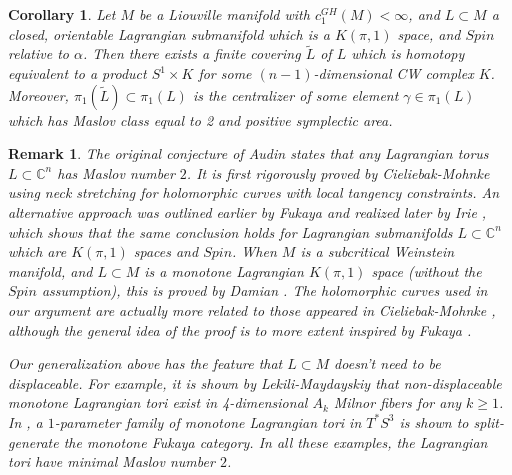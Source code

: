 \documentclass[a4paper]{article}
\newtheorem{corollary}[theorem]{Corollary}
\newtheorem{remark}[theorem]{Remark}
\numberwithin{equation}{section}
\begin{document}
\begin{corollary}\label{corollary:n}
Let $M$ be a Liouville manifold with $c_1^\mathit{GH}(M)<\infty$, and $L\subset M$ a closed, orientable Lagrangian submanifold which is a $K(\pi,1)$ space, and $\mathit{Spin}$ relative to $\alpha$. Then there exists a finite covering $\widetilde{L}$ of $L$ which is homotopy equivalent to a product $S^1\times K$ for some $(n-1)$-dimensional CW complex $K$. Moreover, $\pi_1(\widetilde{L})\subset\pi_1(L)$ is the centralizer of some element $\gamma\in\pi_1(L)$ which has Maslov class equal to 2 and positive symplectic area.
\end{corollary}

\begin{remark}\label{remark:Audin}
The original conjecture of Audin \cite{ma} states that any Lagrangian torus $L\subset\mathbb{C}^n$ has Maslov number $2$. It is first rigorously proved by Cieliebak-Mohnke \cite{cm} using neck stretching for holomorphic curves with local tangency constraints. An alternative approach was outlined earlier by Fukaya \cite{kf} and realized later by Irie \cite{ki2,ki3}, which shows that the same conclusion holds for Lagrangian submanifolds $L\subset\mathbb{C}^n$ which are $K(\pi,1)$ spaces and $\mathit{Spin}$. When $M$ is a subcritical Weinstein manifold, and $L\subset M$ is a monotone Lagrangian $K(\pi,1)$ space (without the $\mathit{Spin}$ assumption), this is proved by Damian \cite{md}. The holomorphic curves used in our argument are actually more related to those appeared in Cieliebak-Mohnke \cite{cm}, although the general idea of the proof is to more extent inspired by Fukaya \cite{kf}. 

Our generalization above has the feature that $L\subset M$ doesn't need to be displaceable. For example, it is shown by Lekili-Maydayskiy \cite{lm} that non-displaceable monotone Lagrangian tori exist in 4-dimensional $A_k$ Milnor fibers for any $k\geq1$. In \cite{ad}, a $1$-parameter family of monotone Lagrangian tori in $T^\ast S^3$ is shown to split-generate the monotone Fukaya category. In all these examples, the Lagrangian tori have minimal Maslov number $2$.
\end{remark}
\end{document}
